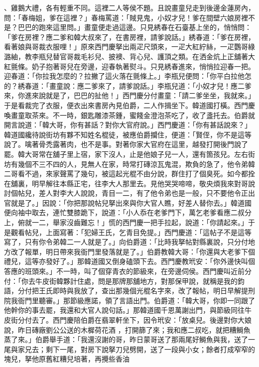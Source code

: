 、雞鵝大禮，各有輕重不同。這裡二人等侯不題。且說畫童兒走到後邊金蓮房內，問：「春梅姐，爹在這裡？」春梅罵道：「賊見鬼，小奴才兒！爹在間壁六娘房裡不是？巴巴的跑來這里問。」畫童便走過這邊。只見綉春在石臺基上坐的，悄悄問：「爹在房裡？應二爹和韓大叔來了，在書房裡，請爹說話。」綉春道：「爹在房裡，看著娘與哥裁衣服哩！」原來西門慶拏出兩疋尺頭來，一疋大紅紵絲，一疋鸚哥綠潞紬，教李瓶兒替官哥裁毛衫兒、披襖、背心兒、護頂之類。在洒金炕上正舖著大紅氈條。奶子抱著哥兒在旁邊，迎春執著熨斗。只見綉春進來，悄悄拉迎春一把。迎春道：「你拉我怎麼的？拉撇了這火落在氈條上。」李瓶兒便問：「你平白拉他怎的？綉春道：「畫童說：應二爹來了，請爹說話。」李瓶兒道：「小奴才兒！應二爹來，你進來說就是了，巴巴的扯他！」西門慶分付畫童：「請二爹坐坐，我就來。」于是看裁完了衣服，便衣出來書房內見伯爵，二人作揖坐下。韓道國打橫。西門慶喚畫童取茶來。不一時，銀匙雕漆茶鍾，蜜餞金澄泡茶吃了，收了盞托去。伯爵就開言說道：「韓大哥，你有甚話？對你大官府說。」西門慶道：「你有甚話說來？」韓道國纔待說街坊有夥不知姓名棍徒，被應伯爵攔住，便道：「賢侄，你不是這等說了。噙著骨禿露著肉，也不是事。對著你家大官府在這里，越發打開後門說了罷。韓大哥常在舖子里上宿，家下沒人，止是他娘子兒一人，還有箇孩兒。左右街坊有幾個不三不四的人，見無人在家，時常打磚涼瓦鬼混，欺負的急了，他令弟韓二哥看不過，來家聲罵了幾句，被這起光棍不由分說，群住打了個臭死。如今都拴在舖裏，明早解往本縣正宅，往李大人那里去。見他哭哭啼啼，敬央煩我來對哥說討個帖兒，差人對李大人說說，青目一二，有了他令弟也是一般，只不要他令正出官就是了。」因說：「你把那說帖兒拏出來與你大官人瞧，好差人替你去。」韓道國便向袖中取去，連忙雙膝跪下，說道：「小人忝在老爹門下，萬乞老爹看應二叔分上，俯就一二，舉家沒齒難忘！」慌的西門慶一把手拉起，說道：「你請起來。」于是觀看帖兒，上面寫著：「犯婦王氏，乞青目免提。」西門慶道：「這帖子不是這等寫了，只有你令弟韓二一人就是了。」向伯爵道：「比時我拏帖對縣裏說，只分付地方改了報單，明日帶來我衙門里發落就是了。」伯爵教韓大哥：「你還與大老爹下個禮兒，這等亦發好了。」那韓道國又倒身磕頭下去。西門慶教玳安：「你外邊快叫個答應的班頭來。」不一時，叫了個穿青衣的節級來，在旁邊伺侯。西門慶叫近前分付：「你去牛皮街韓夥計住處，問是那牌那舖地方，對那保甲說，就稱是我的鈞語，分付把王氏即時與我放了，查出那幾個光棍名字來，改了報帖，明日早解提刑院我衙門里聽審。」那節級應諾，領了言語出門。伯爵道：「韓大哥，你即一同跟了他幹你的事去罷，我還和大官人說句話。」那韓道國千恩萬謝出門，與節級同往牛皮街分付去了。西門慶陪伯爵在翡翠軒坐下，因令玳安：「放桌兒。後邊對你大娘說，昨日磚廠劉公公送的木樨荷花酒 ，打開篩了來；我和應二叔吃，就把糟鰣魚 蒸了來。」伯爵舉手道：「我還沒謝的哥，昨日蒙哥送了那兩尾好鰣魚與我，送了一尾與家兄去；剩下一尾，對房下說拏刀兒劈開，送了一段與小女；餘者打成窄窄的塊兒，拏他原舊紅糟兒培著，再攪些香油 